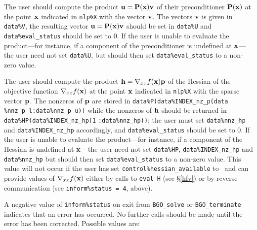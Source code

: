 \documentclass{galahad}
\newcommand{\packagename}{BGO}
\begin{document}
\begin{description}
 The user should compute the product ${\mathbf{u}} = {\mathbf{P}}({\mathbf{x}}){\mathbf{v}}$
     of their preconditioner ${\mathbf{P}}({\mathbf{x}})$ at the point ${\mathbf{x}}$
     indicated in {\tt nlp\%X} with the vector ${\mathbf{v}}$.
     The vectors ${\mathbf{v}}$ is given in {\tt data\%V}, the
     resulting vector ${\mathbf{u}} = {\mathbf{P}}({\mathbf{x}}){\mathbf{v}}$ should be set in {\tt data\%U}
     and {\tt data\%eval\_status}
     should be set to 0. If the user is unable to evaluate the product---for
     instance, if a component of the preconditioner is undefined at
     ${\mathbf{x}}$---the user need not set {\tt data\%U}, but should then set
     {\tt data\%eval\_status} to a non-zero value.

 The user should compute the product
     ${\mathbf{h}} = \nabla_{xx} f({\mathbf{x}}){\mathbf{p}}$ of the Hessian
     of the objective function $\nabla_{xx} f({\mathbf{x}})$ at the point ${\mathbf{x}}$
     indicated in {\tt nlp\%X} with the sparse vector ${\mathbf{p}}$.
     The nonzeros of ${\mathbf{p}}$ are stored in
     {\tt data\%P(data\%INDEX\_nz\_p(data}
     {\tt \%nnz\_p\_l:data\%nnz\_p\_u))}
     while the nonzeros of ${\mathbf{h}}$ should be returned in
     {\tt data\%HP(data\%INDEX\_nz\_hp(1}
     {\tt :data\%nnz\_hp))}; the user must set 
     {\tt data\%nnz\_hp} and {\tt data\%INDEX\_nz\_hp} accordingly,
     and  {\tt data\%eval\_status} should be set to 0. If the user is
     unable to evaluate the product---for instance, if a component of 
     the Hessian is undefined at ${\mathbf{x}}$---the user need not set 
     {\tt data\%HP}, {\tt data\%INDEX\_nz\_hp} and {\tt data\%nnz\_hp}
     but should then set {\tt data\%eval\_status} to a non-zero value.
     This value will not occur if the user has set 
     {\tt control\%hessian\_available} to \true\, and can provide
     values of $\nabla_{xx} f({\mathbf{x}})$  either by calls to {\tt eval\_H} 
     (see \S\ref{hfv}) or by reverse communication (see 
     {\tt inform\%status = 4}, above).
\end{description}



\galerrors
A negative value of {\tt inform\%status} on exit from
{\tt \packagename\_solve}
or
{\tt \packagename\_terminate}
indicates that an error has occurred. No further calls should be made
until the error has been corrected. Possible values are:
\end{document}
